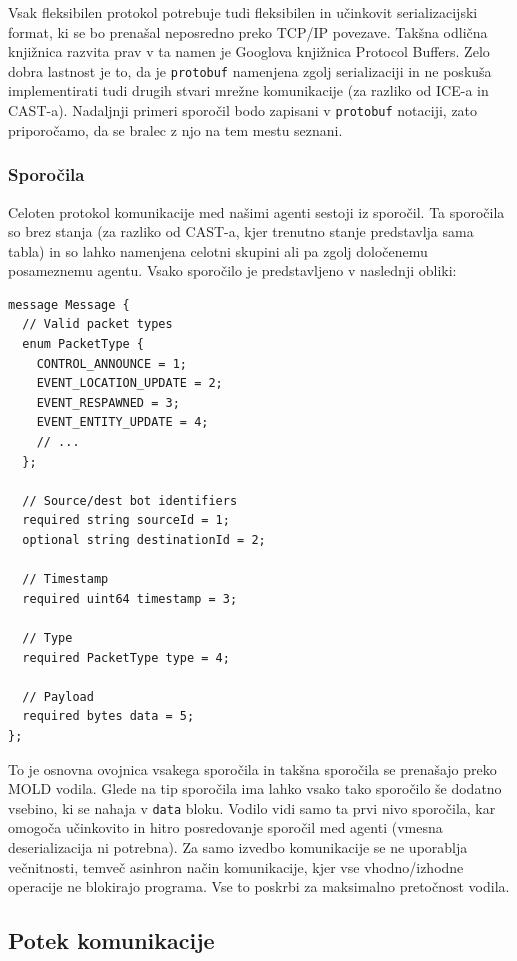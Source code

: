 \documentclass[a4paper,10pt]{article}
\begin{document}
Vsak fleksibilen protokol potrebuje tudi fleksibilen in učinkovit serializacijski format, ki se bo prenašal neposredno preko TCP/IP povezave. Takšna odlična knjižnica razvita prav v ta namen je Googlova knjižnica Protocol Buffers. Zelo dobra lastnost je to, da je \texttt{protobuf} namenjena zgolj serializaciji in ne poskuša implementirati tudi drugih stvari mrežne komunikacije (za razliko od ICE-a in CAST-a). Nadaljnji primeri sporočil bodo zapisani v \texttt{protobuf} notaciji, zato priporočamo, da se bralec z njo na tem mestu seznani.

\subsubsection{Sporočila}

Celoten protokol komunikacije med našimi agenti sestoji iz sporočil. Ta sporočila so brez stanja (za razliko od CAST-a, kjer trenutno stanje predstavlja sama tabla) in so lahko namenjena celotni skupini ali pa zgolj določenemu posameznemu agentu. Vsako sporočilo je predstavljeno v naslednji obliki:

\begin{verbatim}
message Message {
  // Valid packet types
  enum PacketType {
    CONTROL_ANNOUNCE = 1;
    EVENT_LOCATION_UPDATE = 2;
    EVENT_RESPAWNED = 3;
    EVENT_ENTITY_UPDATE = 4;
    // ...
  };
  
  // Source/dest bot identifiers
  required string sourceId = 1;
  optional string destinationId = 2;
  
  // Timestamp
  required uint64 timestamp = 3;
  
  // Type
  required PacketType type = 4;
  
  // Payload
  required bytes data = 5;
};
\end{verbatim}

\noindent
To je osnovna ovojnica vsakega sporočila in takšna sporočila se prenašajo preko MOLD vodila. Glede na tip sporočila ima lahko vsako tako sporočilo še dodatno vsebino, ki se nahaja v \texttt{data} bloku. Vodilo vidi samo ta prvi nivo sporočila, kar omogoča učinkovito in hitro posredovanje sporočil med agenti (vmesna deserializacija ni potrebna). Za samo izvedbo komunikacije se ne uporablja večnitnosti, temveč asinhron način komunikacije, kjer vse vhodno/izhodne operacije ne blokirajo programa. Vse to poskrbi za maksimalno pretočnost vodila.

\subsection{Potek komunikacije}
\end{document}
